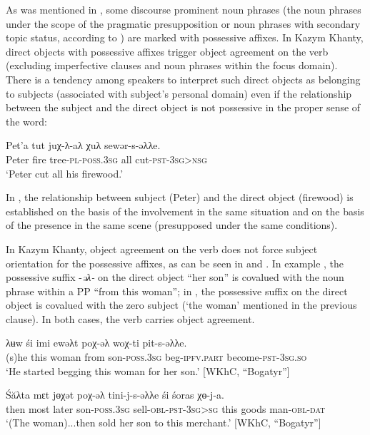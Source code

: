 \documentclass[output=paper]{langscibook}
\begin{document}
\z

As was mentioned in , some discourse prominent noun phrases (the noun phrases under the scope of the pragmatic presupposition or noun phrases with secondary topic status, according to \citealt{Nikolaeva1999Ostyak}) are marked with possessive affixes. In Kazym Khanty, direct objects with possessive affixes trigger object agreement on the verb (excluding imperfective clauses and noun phrases within the focus domain). There is a tendency among speakers to interpret such direct objects as belonging to subjects (associated with subject’s personal domain) even if the relationship between the subject and the direct object is not possessive in the proper sense of the word:

\ea 
\label{ex:Volkova:59}
 \gll Pet’a tut juχ-λ-aλ  χuλ sewər-s-əλλe.\\
 Peter fire tree\textsc{{}-pl-poss.3sg} all cut\textsc{{}-pst-3sg>nsg}\\
 \glt ‘Peter cut all his firewood.’
\z


In , the relationship between subject (Peter) and the direct object (firewood) is established on the basis of the involvement in the same situation and on the basis of the presence in the same scene (presupposed under the same conditions).

In Kazym Khanty, object agreement on the verb does not force subject orientation for the possessive affixes, as can be seen in  and . In example , the possessive suffix -\textit{əλ-} on the direct object “her son” is covalued with the noun phrase %
within a PP “from this woman”; in , the possessive suffix on the direct object is covalued with the zero subject (‘the woman’ mentioned in the previous clause). In both cases, the verb carries object agreement. 

\ea 
\label{ex:Volkova:60}
	\ea
	\label{ex:Volkova:60a}
  	 \gll λʉw śi imi ewəλt poχ-əλ woχ-ti pit-s-əλλe.\\
  	 (s)he this woman from son\textsc{{}-poss.3sg} beg\textsc{{}-ipfv.part} become\textsc{{}-pst-3sg.so}\\
  	 \glt ‘He started begging this woman for her son.’ [WKhC, “Bogatyr”]

	\ex
	\label{ex:Volkova:60b}
  	 \gll Śăλta mԑt jɵχət poχ-əλ tini-j-s-əλλe  śi śoras χɵ-j-a.\\
  	 then most later son\textsc{{}-poss.3sg} sell\textsc{{}-obl-pst-3sg>sg} this goods man\textsc{{}-obl-dat}\\
  	 \glt ‘(The woman)...then sold her son to this merchant.’ [WKhC, “Bogatyr”]
	\z
\z
\end{document}
